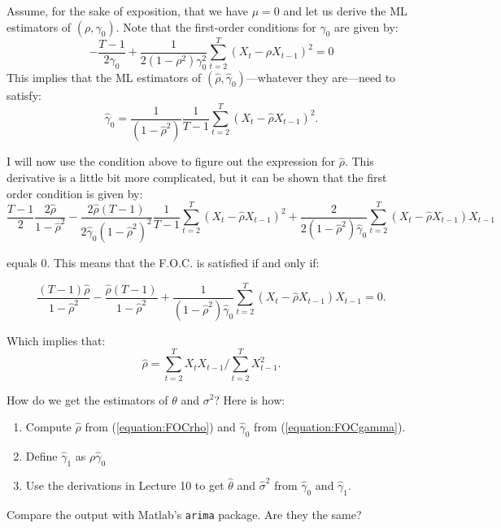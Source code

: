 \documentclass[12] {article}
\begin{document}
Assume, for the sake of exposition, that we have $\mu=0$ and let us derive the ML estimators of $(\rho, \gamma_0)$. Note that the first-order conditions for $\gamma_0$ are given by:
$$-\frac{T-1}{2 \gamma_0} + \frac{1}{2(1-\rho^2) \gamma_0^2} \sum_{t=2}^{T} (X_t - \rho X_{t-1})^2 = 0$$
\noindent This implies that the ML estimators of $(\widehat{\rho}, \widehat{\gamma}_0)$---whatever they are---need to satisfy:
\begin{equation} \label{equation:FOCgamma}
\widehat{\gamma}_0 = \frac{1}{(1-\widehat{\rho}^2)} \frac{1}{T-1} \sum_{t=2}^{T} (X_t - \widehat{\rho} X_{t-1})^2.
\end{equation}

\noindent I will now use the condition above to figure out the expression for $\widehat{\rho}$. This derivative is a little bit more complicated, but it can be shown that the first order condition is given by:
$$ \frac{T-1}{2} \frac{2 \widehat{\rho}}{1-\widehat{\rho}^2} - \frac{2 \widehat{\rho} (T-1) }{2\widehat{\gamma}_0 (1-\widehat{\rho}^2)^2 }  \frac{1}{T-1} \sum_{t=2}^{T} (X_t - \widehat{\rho} X_{t-1})^2 + \frac{2}{2 (1-\widehat{\rho}^2) \widehat{\gamma}_0} \sum_{t=2}^{T} (X_t - \widehat{\rho} X_{t-1}) X_{t-1}$$   

\noindent equals 0. This means that the F.O.C. is satisfied if and only if:

$$ \frac{(T-1) \widehat{\rho}}{1-\widehat{\rho}^2} - \frac{ \widehat{\rho} (T-1) }{ 1-\widehat{\rho}^2 }  + \frac{1}{ (1-\widehat{\rho}^2) \widehat{\gamma}_0} \sum_{t=2}^{T} (X_t - \widehat{\rho} X_{t-1}) X_{t-1} = 0.$$

\noindent Which implies that:
\begin{equation} \label{equation:FOCrho}
\widehat{\rho} = \sum_{t=2}^{T} X_{t}X_{t-1} / \sum_{t=2}^{T} X_{t-1}^2.  
\end{equation}

\noindent How do we get the estimators of $\theta$ and $\sigma^2$? Here is how:

\begin{enumerate}
\item Compute $\widehat{\rho}$ from (\ref{equation:FOCrho}) and $\widehat{\gamma}_0$ from (\ref{equation:FOCgamma}).
\item Define $\widehat{\gamma}_1$ as $\rho \widehat{\gamma}_0$ 
\item Use the derivations in Lecture 10 to get $\widehat{\theta}$ and $\widehat{\sigma}^2$ from $\widehat{\gamma}_0$ and $\widehat{\gamma}_1$. 
\end{enumerate}
\noindent Compare the output with Matlab’s \texttt{arima} package. Are they the same?
\end{document}
